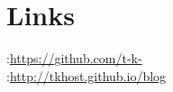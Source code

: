 \documentclass[]{deedy-resume-openfont}
\begin{document}
\begin{minipage}[t]{0.33\textwidth}

\section{Links} 
:\url{https://github.com/t-k-} \\
:\url{http://tkhost.github.io/blog} \\
\sectionsep

%
%

\end{minipage} 
\hfill
\end{document}
